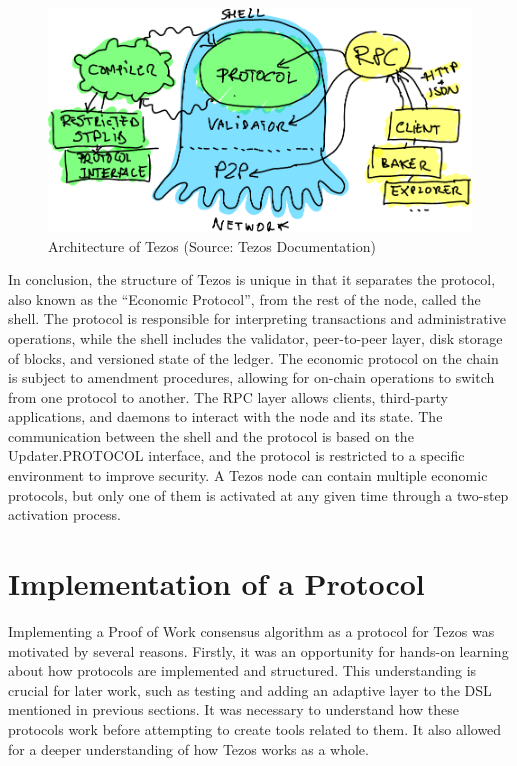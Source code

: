 \begin{figure}[H]
    \centering
    \includegraphics[width=\textwidth,keepaspectratio]{imagens/octupus.pdf}
    \caption{Architecture of Tezos (Source: Tezos Documentation)}
    \label{fig:octupus}

\end{figure}

In conclusion, the structure of Tezos is unique in that it separates the protocol, also known as the ``Economic Protocol'', from the rest of the node, called the shell. The protocol is responsible for interpreting transactions and administrative operations, while the shell includes the validator, peer-to-peer layer, disk storage of blocks, and versioned state of the ledger. The economic protocol on the chain is subject to amendment procedures, allowing for on-chain operations to switch from one protocol to another. The RPC layer allows clients, third-party applications, and daemons to interact with the node and its state. The communication between the shell and the protocol is based on the Updater.PROTOCOL interface, and the protocol is restricted to a specific environment to improve security. A Tezos node can contain multiple economic protocols, but only one of them is activated at any given time through a two-step activation process.


\section{Implementation of a Protocol}

Implementing a Proof of Work consensus algorithm as a protocol for Tezos was motivated by several reasons. Firstly, it was an opportunity for hands-on learning about how protocols are implemented and structured. This understanding is crucial for later work, such as testing and adding an adaptive layer to the DSL mentioned in previous sections. It was necessary to understand how these protocols work before attempting to create tools related to them.
It also allowed for a deeper understanding of how Tezos works as a whole.

